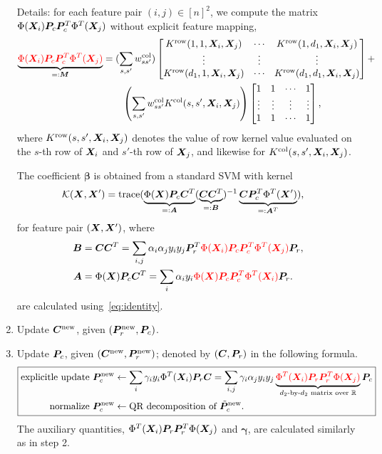 \documentclass[11pt]{article}
\theoremstyle{plain}
\theoremstyle{definition}
\newcommand*{\KeepStyleUnderBrace}[1]{%
  \mathop{%
    \mathchoice
    {\underbrace{\displaystyle#1}}%
    {\underbrace{\textstyle#1}}%
    {\underbrace{\scriptstyle#1}}%
    {\underbrace{\scriptscriptstyle#1}}%
  }\limits
}
\begin{document}
\begin{enumerate}
Details: for each feature pair $(i,j)\in[n]^2$, we compute the matrix $\Phi(\bm X_i)\bm{P}_c\bm{P}^T_c\Phi^T(\bm X_j)$ without explicit feature mapping,
\begin{align}\label{eq:identity}
\KeepStyleUnderBrace{\color{red}\Phi(\mX_i)\mP_c\mP^T_c\Phi^T(\mX_j)}_{=:\mM}&=( \sum_{s,s'}w^{\text{col}}_{ss'}) 
\begin{bmatrix}
K^{\text{row}}(1,1,\mX_i,\mX_j)&\cdots&K^{\text{row}}(1,d_1,\mX_i,\mX_j)\\
\vdots&\vdots&\vdots\\
K^{\text{row}}(d_1,1,\mX_i,\mX_j)&\cdots&K^{\text{row}}(d_1,d_1,\mX_i,\mX_j)
\end{bmatrix}
+\notag \\
& \quad \quad \left(\sum_{s,s'}w^{\text{col}}_{ss'}K^{\text{col}}(s,s',\mX_i,\mX_j)\right)
\begin{bmatrix}
1&1&\cdots&1\\
\vdots&\vdots&\vdots&\vdots\\
1&1&\cdots&1
\end{bmatrix},
\end{align}
where $K^{\text{row}}(s,s',\bm X_i,\bm X_j)$ denotes the value of row kernel value evaluated on the $s$-th row  of $\bm X_i$ and $s'$-th row of $\bm X_j$, and likewise for $K^{\text{col}}(s,s',\bm X_i,\bm X_j)$.

The coefficient $\boldsymbol{\beta}$ is obtained from a standard SVM with kernel
\begin{align}
\tK(\mX,\mX')&=\text{trace}(\KeepStyleUnderBrace{\Phi(\mX)\mP_c\mC^T}_{=:\mA}(\KeepStyleUnderBrace{\mC\mC^T}_{=:\mB})^{-1}\KeepStyleUnderBrace{\mC\mP^T_c\Phi^T(\mX')}_{=:\mA^T}), 
\end{align}
for feature pair $(\bm X,\bm X')$, where
\begin{align}
\bm B&=\bm C\bm C^T=\sum_{i,j}\alpha_i\alpha_jy_iy_j\bm{P}^T_r{\color{red}\Phi(\bm X_i)\bm{P}_c\bm{P}^T_c\Phi^T(\bm X_j)}\bm{P}_r,\\
\bm A&=\Phi(\bm X)\bm{P}_c\bm C^T=\sum_i \alpha_iy_i{\color{red}\Phi(\bm X)\bm{P}_c\bm{P}^T_c\Phi^T(\bm X_i)}\bm{P}_r.
\end{align}
are calculated using~\eqref{eq:identity}.

\item Update $\bm C^{\text{new}}$, given $(\bm{P}^{\text{new}}_r, \bm{P}_c)$.

\item Update $\bm{P}_c$, given $(\bm C^{\text{new}},\bm{P}^{\text{new}}_r)$; denoted by $(\bm C,\bm{P}_r)$ in the following formula.
\[
\boxed{
\begin{aligned}
\text{explicitle update }\mP^{\text{new}}_c&\leftarrow \sum_{i}\gamma_iy_i \Phi^T(\mX_i)\mP_r\mC=\sum_{i,j}\gamma_i\alpha_jy_i y_j \KeepStyleUnderBrace{\color{red}\Phi^T(\mX_i)\mP_r\mP^T_r\Phi(\mX_j)}_{\text{$d_2$-by-$d_2$ matrix over $\mathbb{R}$}}\mP_c\\
\text{normalize } \mP^{\text{new}}_c &\leftarrow \text{QR decomposition of $\tilde \mP^{\text{new}}_c$}.
\end{aligned}
}
\]
The auxiliary quantities, $\Phi^T(\bm X_i)\bm{P}_r\bm{P}^T_r\Phi(\bm X_j)$ and $\boldsymbol{\gamma}$, are calculated similarly as in step 2. 

\end{enumerate}
\end{document}
